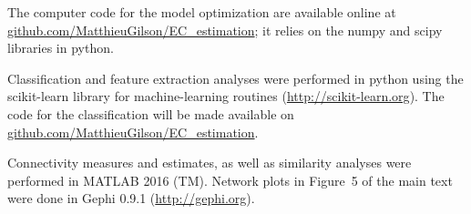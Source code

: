 \documentclass{article}
\begin{document}
The computer code for the model optimization are available online at \url{github.com/MatthieuGilson/EC_estimation}; it relies on the numpy and scipy libraries in python. 

Classification and feature extraction analyses were performed in python using the scikit-learn library for machine-learning routines (\url{http://scikit-learn.org}). The code for the classification will be made available on \url{github.com/MatthieuGilson/EC_estimation}.

Connectivity measures and estimates, as well as similarity analyses were performed in MATLAB 2016 (TM). Network plots in Figure~5 of the main text were done in Gephi 0.9.1 (\url{http://gephi.org}).





  
\end{document}
